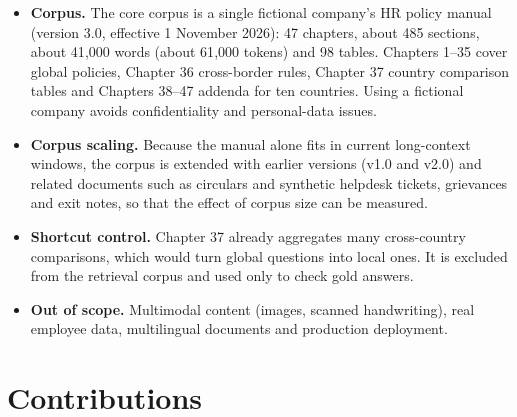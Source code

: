 \documentclass[11pt,letterpaper,oneside]{report}
\begin{document}
\begin{itemize}
  \item \textbf{Corpus.} The core corpus is a single fictional company's HR
  policy manual (version 3.0, effective 1 November 2026): 47 chapters, about
  485 sections, about 41{,}000 words (about 61{,}000 tokens) and 98
  tables. Chapters 1--35 cover global policies, Chapter 36 cross-border
  rules, Chapter 37 country comparison tables and Chapters 38--47 addenda for
  ten countries. Using a fictional company avoids confidentiality and
  personal-data issues.
  \item \textbf{Corpus scaling.} Because the manual alone fits in current
  long-context windows, the corpus is extended with earlier versions (v1.0
  and v2.0) and related documents such as circulars and synthetic helpdesk
  tickets, grievances and exit notes, so that the effect of corpus size can
  be measured.
  \item \textbf{Shortcut control.} Chapter 37 already aggregates many
  cross-country comparisons, which would turn global questions into local
  ones. It is excluded from the retrieval corpus and used only to check
  gold answers.

  \item \textbf{Out of scope.} Multimodal content (images, scanned
  handwriting), real employee data, multilingual documents and production
  deployment.
\end{itemize}

\section{Contributions}
\label{sec:contrib}
\end{document}
